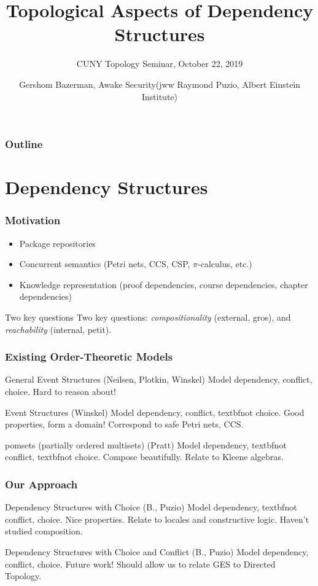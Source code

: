 \documentclass{beamer}
\title{Topological Aspects of Dependency Structures}
\subtitle{CUNY Topology Seminar, October 22, 2019}
\author{Gershom Bazerman, Awake Security\linebreak(jww Raymond Puzio, Albert Einstein Institute)}
\begin{document}
\begin{frame}
		\titlepage
\end{frame}
\begin{frame}
\frametitle{Outline}
\tableofcontents
\end{frame}

\section{Dependency Structures}

\begin{frame}
\frametitle{Motivation}
\begin{itemize}
\item Package repositories
\item Concurrent semantics (Petri nets, CCS, CSP, \(\pi\)-calculus, etc.)
\item Knowledge representation (proof dependencies, course dependencies, chapter dependencies)
\end{itemize}
\begin{block}{Two key questions}
Two key questions: \textit{compositionality} (external, gros), and \textit{reachability} (internal, petit).
\end{block}
\end{frame}

\begin{frame}
\frametitle{Existing Order-Theoretic Models}
\begin{block}{General Event Structures (Neilsen, Plotkin, Winskel)}
Model dependency, conflict, choice. Hard to reason about!
\end{block}
\begin{block}{Event Structures (Winskel)}
Model dependency, conflict, textbf{not} choice. Good properties, form a domain! Correspond to safe Petri nets, CCS.
\end{block}
\begin{block}{pomsets (partially ordered multisets) (Pratt)}
Model dependency, textbf{not} conflict, textbf{not} choice. Compose beautifully. Relate to Kleene algebras.
\end{block}
\end{frame}

\begin{frame}
\frametitle{Our Approach}
\begin{block}{Dependency Structures with Choice (B., Puzio)}
Model dependency, textbf{not} conflict, choice. Nice properties. Relate to locales and constructive logic. Haven't studied composition.
\end{block}
\begin{block}{Dependency Structures with Choice and Conflict (B., Puzio)}
Model dependency, conflict, choice. Future work! Should allow us to relate GES to Directed Topology.
\end{block}
\end{frame}
\end{document}
